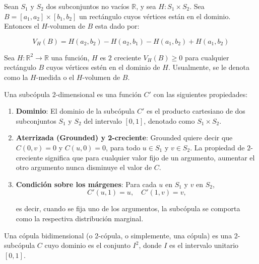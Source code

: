 \begin{defn}
    Sean $S_1$ y $S_2$ dos subconjuntos no vacíos $\mathbb{R}$, y sea $H:S_1 \times S_2$. Sea $B = [a_1, a_2] \times [b_1, b_2]$ un rectángulo cuyos vértices están en el dominio. Entonces el $H$-volumen de $B$ esta dado por:

    \begin{equation}
        V_H(B) = H(a_2, b_2) - H(a_2, b_1) - H(a_1, b_2) + H(a_1, b_2)
    \end{equation}
\end{defn}

\begin{defn}[$2$-creciente]
    Sea $H: \mathbb{R}^2 \to \mathbb{R}$ una función, $H$ es $2$ creciente $V_H(B) \geq 0$ para cualquier rectángulo $B$ cuyos vértices estén en el dominio de $H$. Usualmente, se le denota como la $H$-medida o el $H$-volumen de $B$.
\end{defn}



\begin{defn}[Subcópula]
    Una subcópula 2-dimensional es una función $C'$ con las siguientes propiedades:

    \begin{enumerate}
        \item \textbf{Dominio}: El dominio de la subcópula $C'$ es el producto cartesiano de dos subconjuntos $S_1$ y $S_2$ del intervalo $[0, 1]$, denotado como $S_1 \times S_2$.

        \item \textbf{Aterrizada (Grounded) y 2-creciente}: Grounded quiere decir que $C(0,v)=0$ y $C(u,0)=0$, para todo $u \in S_1$ y $v \in S_2$. La propiedad de $2$-creciente significa que para cualquier valor fijo de un argumento, aumentar el otro argumento nunca disminuye el valor de $C$.

        \item \textbf{Condición sobre los márgenes}: Para cada $u$ en $S_1$ y $v$ en $S_2$, 
        \begin{equation}
            C'(u, 1) = u, \quad C'(1, v) = v,
        \end{equation}

        es decir, cuando se fija uno de los argumentos, la subcópula se comporta como la respectiva distribución marginal.
    \end{enumerate}
\end{defn}


\begin{defn}
    Una cópula bidimensional (o 2-cópula, o simplemente, una cópula) es una 2-subcópula $C$ cuyo dominio es el conjunto $I^2$, donde $I$ es el intervalo unitario $[0,1]$. 
\end{defn}

